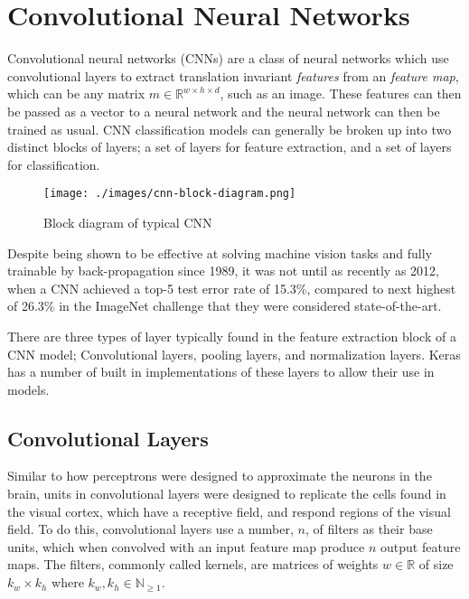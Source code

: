 \documentclass[12pt,a4paper,titlepage,twoside]{report}
\begin{document}
\section{Convolutional Neural Networks}
	Convolutional neural networks (CNNs) are a class of neural networks which use convolutional layers to extract translation invariant \textit{features} from an \textit{feature map}, which can be any matrix $m \in \mathbb{R}^{w \times h \times d}$\cite{cnn-analysis}, such as an image. These features can then be passed as a vector to a neural network and the neural network can then be trained as usual. CNN classification models can generally be broken up into two distinct blocks of layers; a set of layers for feature extraction, and a set of layers for classification. \par
	\begin{figure}[h!]
  		\centering
  		\texttt{[image: ./images/cnn-block-diagram.png]}
  		\caption{Block diagram of typical CNN}
  		\label{fig:cnn-block}
	\end{figure}
	Despite being shown to be effective at solving machine vision tasks and fully trainable by back-propagation since 1989\cite{cnn-backprop}, it was not until as recently as 2012, when a CNN achieved a top-5 test error rate of 15.3\%, compared to next highest of 26.3\% in the ImageNet challenge\cite{cnn-image-net} that they were considered state-of-the-art. \par
	
	There are three types of layer typically found in the feature extraction block of a CNN model; Convolutional layers, pooling layers, and normalization layers\cite{cnn-analysis}. Keras\cite{keras} has a number of built in  implementations of these layers to allow their use in models.
	\subsection{Convolutional Layers}
	Similar to how perceptrons were designed to approximate the neurons in the brain, units in convolutional layers were designed to replicate the cells found in the visual cortex, which have a receptive field, and respond regions of the visual field\cite{cnn-biology}. To do this, convolutional layers use a number, $n$, of filters as their base units, which when convolved with an input feature map produce $n$ output feature maps. The filters, commonly called kernels, are matrices of weights $w \in \mathbb{R}$ of size $k_w \times k_h$ where $k_w, k_h \in \mathbb{N}_{\geq1}$\cite{cnn-analysis}.
	
\end{document}

